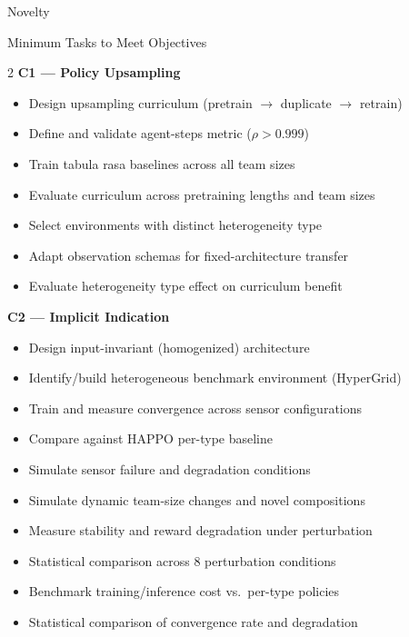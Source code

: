 \begin{frame}[shrink=15]{Novelty}
\end{frame}


\begin{frame}[shrink=7]{Minimum Tasks to Meet Objectives}
    \vspace{1em}
    \scriptsize
    \newcommand{\chit}{\item[\checkmark]}
    
    \begin{multicols}{2}
        \textbf{C1 — Policy Upsampling}
        \begin{itemize}
            \chit Design upsampling curriculum (pretrain $\to$ duplicate $\to$ retrain) %
            \chit Define and validate agent-steps metric ($\rho > 0.999$) %
            \chit Train tabula rasa baselines across all team sizes %
            \chit Evaluate curriculum across pretraining lengths and team sizes %
            \chit Select environments with distinct heterogeneity type %
            \chit Adapt observation schemas for fixed-architecture transfer %
            \chit Evaluate heterogeneity type effect on curriculum benefit %
        \end{itemize}
        \vspace{0.4em}
        
        \textbf{C2 — Implicit Indication}
        \begin{itemize}
            \chit Design input-invariant (homogenized) architecture %
            \chit Identify/build heterogeneous benchmark environment (HyperGrid) %
            \chit Train and measure convergence across sensor configurations %
            \chit Compare against HAPPO per-type baseline %
            \chit Simulate sensor failure and degradation conditions %
            \chit Simulate dynamic team-size changes and novel compositions %
            \chit Measure stability and reward degradation under perturbation  %
            \chit Statistical comparison across 8 perturbation conditions %
            \chit Benchmark training/inference cost vs.\ per-type policies %
            \chit Statistical comparison of convergence rate and degradation %
        \end{itemize}
        \vspace{0.4em}
        

\end{multicols}
\end{frame}
